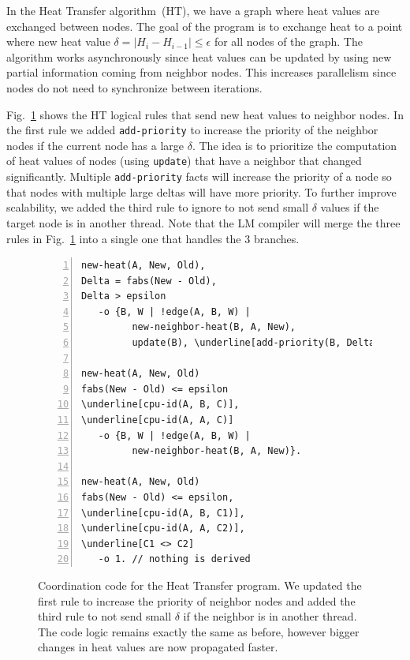 In the Heat Transfer algorithm~(HT), we have a graph where heat values are
exchanged between nodes. The goal of the program is to exchange heat to a point
where new heat value $\delta = |H_i -
H_{i-1}| \le \epsilon$ for all nodes of the graph. The algorithm works
asynchronously since heat values can be updated by using new partial information
coming from neighbor nodes. This increases parallelism since nodes do not need
to synchronize between iterations.

Fig.~\ref{code:ht} shows the HT logical rules that send new heat values to
neighbor nodes. In the first rule we added \texttt{add-priority} to increase the priority of the neighbor
nodes if the current node has a large $\delta$. The idea is to prioritize the
computation of heat values of nodes (using \texttt{update}) that have a neighbor
that changed significantly. Multiple \texttt{add-priority} facts will
increase the priority of a node so that nodes with multiple large deltas will
have more priority. To further improve scalability, we added the third rule to
ignore to not send small $\delta$ values if the target node is in another
thread. Note that the LM compiler will merge the three rules in
Fig.~\ref{code:ht} into a single one that handles the 3 branches.

\begin{figure}[h!]
\scriptsize\begin{Verbatim}[numbers=left,commandchars=\\\[\]]
new-heat(A, New, Old),
Delta = fabs(New - Old),
Delta > epsilon
   -o {B, W | !edge(A, B, W) |
         new-neighbor-heat(B, A, New),
         update(B), \underline[add-priority(B, Delta)]}.

new-heat(A, New, Old)
fabs(New - Old) <= epsilon
\underline[cpu-id(A, B, C)],
\underline[cpu-id(A, A, C)]
   -o {B, W | !edge(A, B, W) |
         new-neighbor-heat(B, A, New)}.

new-heat(A, New, Old)
fabs(New - Old) <= epsilon,
\underline[cpu-id(A, B, C1)],
\underline[cpu-id(A, A, C2)],
\underline[C1 <> C2]
   -o 1. // nothing is derived
\end{Verbatim}
  \caption{Coordination code for the Heat Transfer program. We updated the first rule
     to increase the priority of neighbor nodes and added the third rule to not
     send small $\delta$ if the neighbor is in another thread. The code logic remains exactly
     the same as before, however bigger changes in heat values are now
     propagated faster.}
  \label{code:ht}
\end{figure}
\normalsize

